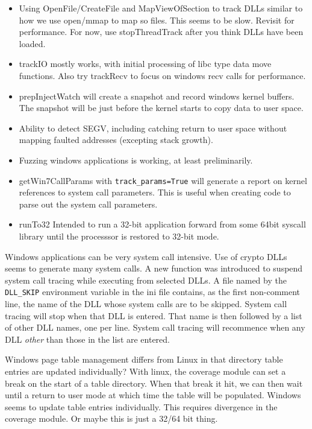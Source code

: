 \documentclass[titlepage]{article}
\begin{document}
\begin{appendices}
\begin{itemize}
\item Using OpenFile/CreateFile and MapViewOfSection to track DLLs similar to how we use open/mmap to map so files.  This seems to be slow.
Revisit for performance.  For now, use stopThreadTrack after you think DLLs have been loaded.

\item trackIO mostly works, with initial processing of libc type data move functions.  Also try trackRecv to focus on windows recv calls for performance.  

\item prepInjectWatch will create a snapshot and record windows kernel buffers.  The snapshot will be just before the kernel starts to copy data to user space.

\item Ability to detect SEGV, including catching return to user space without mapping faulted addresses (excepting stack growth).

\item Fuzzing windows applications is working, at least preliminarily.

\item getWin7CallParams with {\tt track\_params=True} will generate a report on kernel references to system call parameters.  This is useful when creating code to parse out
the system call parameters.

\item runTo32 Intended to run a 32-bit application forward from some 64bit syscall library until the processsor is restored to 32-bit mode.
\end{itemize}
\label{dll_skip}
Windows applications can be very system call intensive.  Use of crypto DLLs seems to generate many system calls.  A new function was introduced to suspend 
system call tracing while executing from selected DLLs. A file named by the {\tt DLL\_SKIP} environment variable in the ini file contains, as the first non-comment line, the name of the DLL whose system calls are to be 
skipped. System call tracing will stop when that DLL is entered.  That name is then followed by a list of other DLL names, one per line.  
System call tracing will recommence when any DLL \textit{other} than those in the list are entered.

Windows page table management differs from Linux in that directory table entries are updated individually? With linux, the coverage module can
set a break on the start of a table directory.  When that break it hit, we can then wait until a return to user mode at which time the
table will be populated.  Windows seems to update table entries individually.  This requires divergence in the coverage module.  Or maybe this is just a 32/64 bit thing.


\end{appendices}
\end{document}
